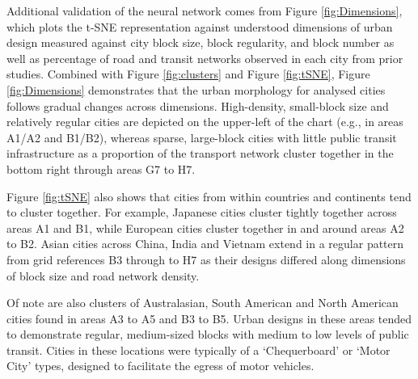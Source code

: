 \documentclass[preprint,12pt]{elsarticle}
\begin{document}
Additional validation of the neural network comes from Figure \ref{fig:Dimensions}, which plots the t-SNE representation against understood dimensions of urban design measured against city block size, block regularity, and block number as well as percentage of road and transit networks observed in each city from prior studies\cite{Thompson2020,Nice2019b}. Combined with Figure \ref{fig:clusters} and Figure \ref{fig:tSNE}, Figure \ref{fig:Dimensions} demonstrates that the urban morphology for analysed cities follows gradual changes across dimensions. High-density, small-block size and relatively regular cities are depicted on the upper-left of the chart (e.g., in areas A1/A2 and B1/B2), whereas sparse, large-block cities with little public transit infrastructure as a proportion of the transport network cluster together in the bottom right through areas G7 to H7. 

Figure \ref{fig:tSNE} also shows that cities from within countries and continents tend to cluster together. For example, Japanese cities cluster tightly together across areas A1 and B1, while European cities cluster together in and around areas A2 to B2. Asian cities across China, India and Vietnam extend in a regular pattern from grid references B3 through to H7 as their designs differed along dimensions of block size and road network density.

Of note are also clusters of Australasian, South American and North American cities found in areas A3 to A5 and B3 to B5. Urban designs in these areas tended to demonstrate regular, medium-sized blocks with medium to low levels of public transit. Cities in these locations were typically of a `Chequerboard' or `Motor City' types, designed to facilitate the egress of motor vehicles.
\end{document}
